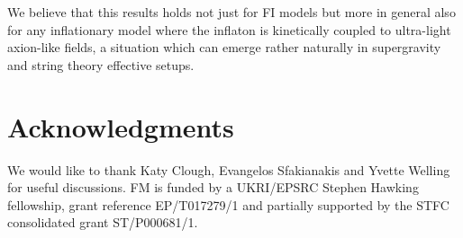 \documentclass[aps,prd,a4paper,twocolumn,amsmath,showpacs,superscriptaddress,nofootinbib,preprintnumbers]{revtex4-1}
\begin{document}
We believe that this results holds not just for FI models but more in general also for any inflationary model where the inflaton is kinetically coupled to ultra-light axion-like fields, a situation which can emerge rather naturally in supergravity and string theory effective setups.








\section*{Acknowledgments}

We would like to thank Katy Clough, Evangelos Sfakianakis and Yvette Welling for useful discussions. FM is funded by a UKRI/EPSRC Stephen Hawking fellowship, grant reference
EP/T017279/1 and partially supported by the STFC consolidated grant ST/P000681/1.
\end{document}
